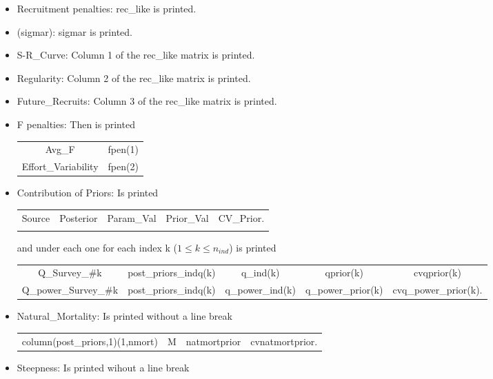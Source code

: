 \documentclass{article}
\begin{document}
\begin{itemize}
\begin{center}
\begin{tabular}{c c c c c}
        \end{tabular}
    \end{center}
    \item Recruitment penalties:  rec\_like is printed.
    \item  (sigmar): sigmar is printed.
    \item S-R\_Curve: Column 1 of the rec\_like matrix is printed.
    \item Regularity:  Column 2 of the rec\_like matrix is printed.
    \item Future\_Recruits: Column 3 of the rec\_like matrix is printed.
    \item F penalties: Then is printed
    \begin{center}
        \begin{tabular}{c c}
          Avg\_F    &  fpen(1)\\
          Effort\_Variability  &  fpen(2)
        \end{tabular}
    \end{center}
    \item Contribution of Priors: Is printed
    \begin{center}
        \begin{tabular}{c c c c c}
           Source  &   Posterior &  Param\_Val & Prior\_Val &  CV\_Prior.\\
             & 
        \end{tabular}
    \end{center}
    and under each one for each index k ($1\leq k \leq n_{ind}$) is printed
    \begin{center}
        \begin{tabular}{c c c c c}
         Q\_Survey\_\#k & post\_priors\_indq(k) & q\_ind(k) &  qprior(k) & cvqprior(k) \\
         Q\_power\_Survey\_\#k    &  post\_priors\_indq(k) & q\_power\_ind(k) & q\_power\_prior(k) & cvq\_power\_prior(k).
        \end{tabular}
    \end{center}
    \item Natural\_Mortality:  Is printed without a line break
    \begin{center}
        \begin{tabular}{c c c c} 
           column(post\_priors,1)(1,nmort)  & M & natmortprior & cvnatmortprior.\\
        \end{tabular}
    \end{center}
    \item Steepness: Is printed wihout a line break

\end{itemize}
\end{document}
